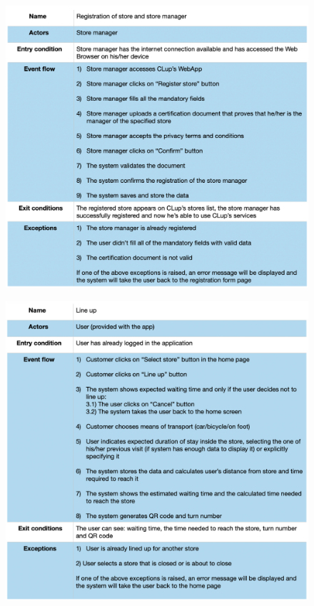 \documentclass{article}
\begin{document}
\begin{figure}[H]
  \includegraphics[width=\linewidth]{RegistrationStoreUseCase.png}
  
\end{figure}

\begin{figure}[H]
  \includegraphics[width=\linewidth]{LineUpUseCase.png}
  
\end{figure}
\end{document}
